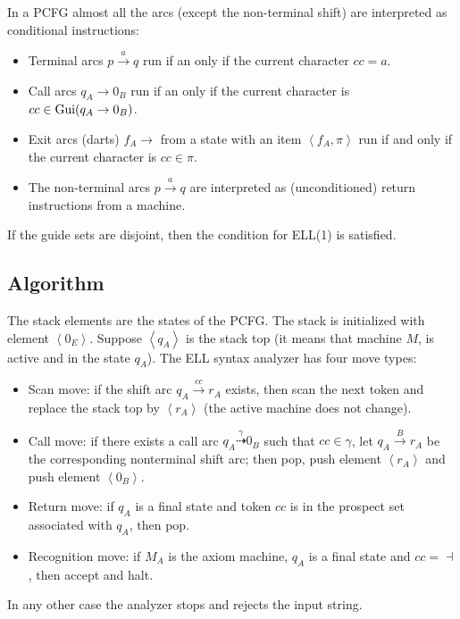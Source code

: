 In a PCFG almost all the arcs (except the non-terminal shift) are interpreted as conditional instructions: 
\begin{itemize}
    \item Terminal arcs $p \overset{a}{\rightarrow} q$ run if an only if the current character $cc=a$. 
    \item Call arcs $q_A \rightarrow 0_B$ run if an only if the current character is $cc \in \textnormal{Gui}(q_A \rightarrow 0_B)$. 
    \item Exit arcs (darts) $f_A \rightarrow$ from a state with an item $\left\langle f_A, \pi \right\rangle$ run if and only if the current character is $cc \in \pi$. 
    \item The non-terminal arcs $p \overset{a}{\rightarrow} q$ are interpreted as (unconditioned) return instructions from a machine. 
\end{itemize}
\begin{property}
    If the guide sets are disjoint, then the condition for ELL(1) is satisfied. 
\end{property}

\subsection*{Algorithm}
The stack elements are the states of the PCFG. 
The stack is initialized with element $\left\langle 0_E \right\rangle$. 
Suppose $\left\langle q_A \right\rangle$ is the stack top (it means that machine $M$, is active and in the state $q_A$). 
The ELL syntax analyzer has four move types: 
\begin{itemize}
    \item Scan move: if the shift arc $q_A \overset{cc}{\rightarrow}r_A$ exists, then scan the next token and replace the stack top by $\left\langle r_A \right\rangle$ (the active machine does not change). 
    \item Call move: if there exists a call arc $q_A \overset{\gamma}{\dashrightarrow} 0_B$ such that $cc \in \gamma$, let $q_A \overset{B}{\rightarrow}r_A$ be the corresponding nonterminal shift arc; then pop, push element $\left\langle r_A \right\rangle$ and push element $\left\langle 0_B \right\rangle$.
    \item Return move: if $q_A$ is a final state and token $cc$ is in the prospect set associated with $q_A$, then pop. 
    \item Recognition move: if $M_A$ is the axiom machine, $q_A$ is a final state and $cc =\dashv$, then accept and halt. 
\end{itemize}
In any other case the analyzer stops and rejects the input string.

